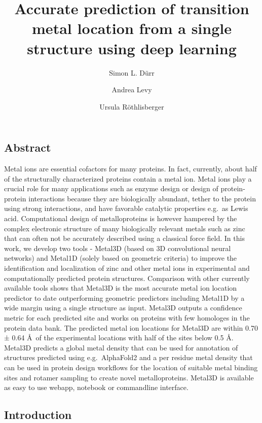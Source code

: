 \documentclass[  ASAPversion,
  ,
  9pt]{elife}
\title{Accurate prediction of transition metal location from a single structure using deep learning}
\author[1]{Simon L. Dürr}
\author[1]{Andrea Levy}
\author[1]{Ursula Röthlisberger}
\affil[1]{Laboratory of Computational Chemistry and Biochemistry, Institute of Chemical Sciences and Engineering, Swiss Federal Institute of Technology (EPFL) CH-1015 Lausanne, Switzerland}
\begin{document}
\begin{frontmatter}
\maketitle
\end{frontmatter}




\hypertarget{abstract}{%
\subsection{Abstract}\label{abstract}}

Metal ions are essential cofactors for many proteins. In fact, currently, about half of the structurally characterized proteins contain a metal ion. Metal ions play a crucial role for many applications such as enzyme design or design of protein-protein interactions because they are biologically abundant, tether to the protein using strong interactions, and have favorable catalytic properties e.g.~as Lewis acid. Computational design of metalloproteins is however hampered by the complex electronic structure of many biologically relevant metals such as zinc that can often not be accurately described using a classical force field. In this work, we develop two tools - Metal3D (based on 3D convolutional neural networks) and Metal1D (solely based on geometric criteria) to improve the identification and localization of zinc and other metal ions in experimental and computationally predicted protein structures. Comparison with other currently available tools shows that Metal3D is the most accurate metal ion location predictor to date outperforming geometric predictors including Metal1D by a wide margin using a single structure as input. Metal3D outputs a confidence metric for each predicted site and works on proteins with few homologes in the protein data bank. The predicted metal ion locations for Metal3D are within 0.70 ± 0.64 \AA\, of the experimental locations with half of the sites below 0.5 \AA . Metal3D predicts a global metal density that can be used for annotation of structures predicted using e.g.~AlphaFold2 and a per residue metal density that can be used in protein design workflows for the location of suitable metal binding sites and rotamer sampling to create novel metalloproteins. Metal3D is available as easy to use webapp, notebook or commandline interface.

\hypertarget{introduction}{%
\subsection{Introduction}\label{introduction}}
\end{document}
